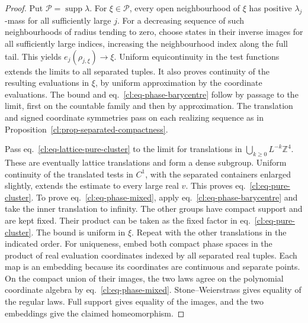 \documentclass[11pt,letterpaper,reqno]{amsart}
\numberwithin{equation}{section}
\renewcommand{\eqref}[1]{\textup{eq.~\ref{#1}}}
\theoremstyle{definition}
\theoremstyle{remark}
\begin{document}
\begin{proof}
Put \(\mathcal P=\operatorname{supp}\lambda\). For
\(\xi\in\mathcal P\), every open neighbourhood of \(\xi\)
has positive \(\lambda_j\)-mass for all sufficiently large
\(j\). For a decreasing sequence of such neighbourhoods
of radius tending to zero, choose states in their inverse
images for all sufficiently large indices, increasing the
neighbourhood index along the full tail. This yields
\(e_j(\rho_{j,\xi})\to\xi\).
Uniform equicontinuity in the test functions extends the
limits to all separated tuples. It also proves continuity
of the resulting evaluations in \(\xi\), by uniform
approximation by the coordinate evaluations. The bound
and \eqref{cl:eq-phase-barycentre} follow by passage to
the limit, first on the countable family and then by
approximation.
The translation and signed coordinate symmetries pass on
each realizing sequence as in
Proposition~\ref{cl:prop-separated-compactness}.

Pass \eqref{cl:eq-lattice-pure-cluster} to the limit for
translations in \(\bigcup_{k\ge0}L^{-k}\mathbb Z^4\).
These are eventually lattice translations and form a dense
subgroup. Uniform continuity of the translated tests in
\(C^1\), with the separated containers enlarged slightly,
extends the estimate to every large real \(v\).
This proves \eqref{cl:eq-pure-cluster}.
To prove \eqref{cl:eq-phase-mixed}, apply
\eqref{cl:eq-phase-barycentre} and take the inner
translation to infinity. The other groups have compact
support and are kept fixed. Their product can be taken
as the fixed factor in \eqref{cl:eq-pure-cluster}.
The bound is uniform in \(\xi\). Repeat with the other
translations in the indicated order. For uniqueness,
embed both compact phase spaces in the product of real
evaluation coordinates indexed by all separated real
tuples. Each map is an embedding because its coordinates
are continuous and separate points. On the compact
union of their images, the two laws agree on the polynomial
coordinate algebra by \eqref{cl:eq-phase-mixed}.
Stone--Weierstrass gives equality of the regular laws.
Full support gives equality of the images, and the two
embeddings give the claimed homeomorphism.
\end{proof}
\end{document}
